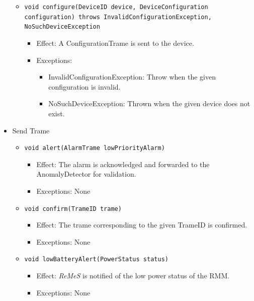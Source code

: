 \documentclass[a4paper,10pt]{article}
\newcommand{\rem}{\emph{ReMeS}\xspace}
\begin{document}
\begin{itemize}
\begin{itemize}
        \item \texttt{void configure(DeviceID device, DeviceConfiguration configuration) throws InvalidConfigurationException, NoSuchDeviceException}
        \begin{itemize}
        	\item Effect: A ConfigurationTrame is sent to the device.
            \item Exceptions:
            \begin{itemize}
            	\item InvalidConfigurationException: Throw when the given configuration is invalid.
            	\item NoSuchDeviceException: Thrown when the given device does not exist.
            \end{itemize}
        \end{itemize}

    \end{itemize}

    \item Send Trame
    \begin{itemize}
        \item \texttt{void alert(AlarmTrame lowPriorityAlarm)}
        \begin{itemize}
            \item Effect: The alarm is acknowledged and forwarded to the AnomalyDetector for validation.
            \item Exceptions: None
		\end{itemize}
        \item \texttt{void confirm(TrameID trame)}
        \begin{itemize}
        	\item Effect: The trame corresponding to the given TrameID is confirmed.
            \item Exceptions: None
        \end{itemize}
        
        \item \texttt{void lowBatteryAlert(PowerStatus status)}
        \begin{itemize}
        	\item Effect: \rem is notified of the low power status of the RMM.
            \item Exceptions: None
        \end{itemize}
        

\end{itemize}
\end{itemize}
\end{document}
